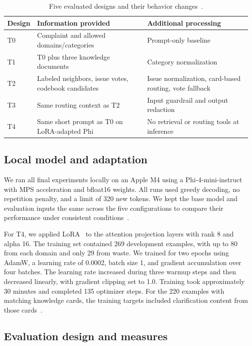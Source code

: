\documentclass[11pt,letterpaper]{article}
\begin{document}
\begin{table}[htbp]
\centering
\caption{Five evaluated designs and their behavior changes~\cite{archive}.}
\label{tab:designs}
\begin{tabularx}{\textwidth}{@{}l L L@{}}
\toprule
Design & Information provided & Additional processing \\
\midrule
T0 & Complaint and allowed domains/categories & Prompt-only baseline \\
T1 & T0 plus three knowledge documents & Category normalization \\
T2 & Labeled neighbors, issue votes, codebook candidates & Issue normalization, card-based routing, vote fallback \\
T3 & Same routing context as T2 & Input guardrail and output redaction \\
T4 & Same short prompt as T0 on LoRA-adapted Phi & No retrieval or routing tools at inference \\
\bottomrule
\end{tabularx}
\end{table}

\subsection{Local model and adaptation}

We ran all final experiments locally on an Apple M4 using a Phi-4-mini-instruct with MPS acceleration and bfloat16 weights. All runs used greedy decoding, no repetition penalty, and a limit of 320 new tokens. We kept the base model and evaluation inputs the same across the five configurations to compare their performance under consistent conditions~\cite{team}.

For T4, we applied LoRA~\cite{lora} to the attention projection layers with rank 8 and alpha 16. The training set contained 269 development examples, with up to 80 from each domain and only 29 from waste. We trained for two epochs using AdamW, a learning rate of 0.0002, batch size 1, and gradient accumulation over four batches. The learning rate increased during three warmup steps and then decreased linearly, with gradient clipping set to 1.0. Training took approximately 30 minutes and completed 135 optimizer steps. For the 220 examples with matching knowledge cards, the training targets included clarification content from those cards~\cite{team}.

\subsection{Evaluation design and measures}
\end{document}
